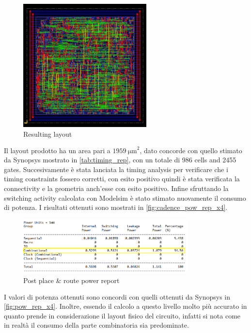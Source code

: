 \begin{figure}[h]
	\center
	\includegraphics[width=0.6\textwidth]{images/IIR_filter_period_min_x4_place.jpg}
	\caption{Resulting layout}
	\label{fig:layout}
\end{figure}

Il layout prodotto ha un area pari a $\SI{1959}{\micro\meter}^2$, dato concorde con quello stimato da Synopsys mostrato in \autoref{tab:timing_rep}, con un totale di 986 cells and 2455 gates. Succesivamente è stata lanciata la timing analysis per verificare che i timing constraints fossero corretti, con esito positivo quindi è stata verificata la connectivity e la geometria anch'esse con esito positivo. Infine sfruttando la switching activity calcolata con Modelsim è stato stimato nuovamente il consumo di potenza. I risultati ottenuti sono mostrati in \autoref{fig:cadence_pow_rep_x4}.

\begin{figure}[h]
	\center
	\includegraphics[width=0.8\textwidth]{images/rep_power_x4_cadence_mod.png}
	\caption{Post place \& route power report}
	\label{fig:cadence_pow_rep_x4}
\end{figure}

I valori di potenza ottenuti sono concordi con quelli ottenuti da Synopsys in \autoref{fig:pow_rep_x4}. Inoltre, essendo il calcolo a questo livello molto più accurato in quanto prende in considerazione il layout fisico del circuito, infatti si nota come in realtà il consumo della parte combinatoria sia predominate.
